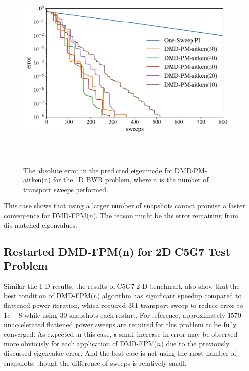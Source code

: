 \begin{figure}[htb]%
    \centering
    \includegraphics[height=4.0in]{tex/figures/dmd_ospi_semilog_1d.pdf}
    \caption{The absolute error in the predicted eigenmode for DMD-PM-aitken(n) for the 1D BWR problem, where n is the number of transport sweeps performed.}
    \label{fig:DMD-FPM_1d}
\end{figure}

This case shows that using a larger number of snapshots cannot promise a faster convergence for DMD-FPM($n$).
The reason might be the error remaining from dis-matched eigenvalues.
\subsection{Restarted DMD-FPM(n) for 2D C5G7 Test Problem}

Similar the 1-D results, the results of C5G7 2-D benchmark also show that the best condition of DMD-FPM($n$) algorithm has significant speedup compared to flattened power iteration, which required 351 transport sweep to reduce error to $1e-8$ while using 30 snapshots each restart.
For reference, approximately 1570 unaccelerated flattened power sweeps are required for this problem to be fully converged.
As expected in this case, a small increase in error may be observed more obviously for each application of DMD-FPM($n$) due to the previously discussed eigenvalue error.
And the best case is not using the most number of snapshots, though the difference of sweeps is relatively small.

